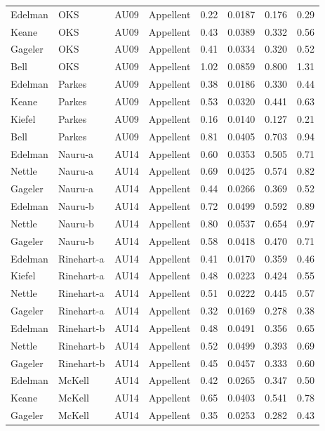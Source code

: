 \documentclass{monashthesis}
\begin{document}
\begin{center}
\begin{longtable}{llllllll}
Edelman & OKS & AU09 & Appellent & 0.22 & 0.0187 & 0.176 & 0.29 \\
Keane & OKS & AU09 & Appellent & 0.43 & 0.0389 & 0.332 & 0.56 \\
Gageler & OKS & AU09 & Appellent & 0.41 & 0.0334 & 0.320 & 0.52 \\
Bell & OKS & AU09 & Appellent & 1.02 & 0.0859 & 0.800 & 1.31 \\
Edelman & Parkes & AU09 & Appellent & 0.38 & 0.0186 & 0.330 & 0.44 \\
Keane & Parkes & AU09 & Appellent & 0.53 & 0.0320 & 0.441 & 0.63 \\
Kiefel & Parkes & AU09 & Appellent & 0.16 & 0.0140 & 0.127 & 0.21 \\
Bell & Parkes & AU09 & Appellent & 0.81 & 0.0405 & 0.703 & 0.94 \\
Edelman & Nauru-a & AU14 & Appellent & 0.60 & 0.0353 & 0.505 & 0.71 \\
Nettle & Nauru-a & AU14 & Appellent & 0.69 & 0.0425 & 0.574 & 0.82 \\
Gageler & Nauru-a & AU14 & Appellent & 0.44 & 0.0266 & 0.369 & 0.52 \\
Edelman & Nauru-b & AU14 & Appellent & 0.72 & 0.0499 & 0.592 & 0.89 \\
Nettle & Nauru-b & AU14 & Appellent & 0.80 & 0.0537 & 0.654 & 0.97 \\
Gageler & Nauru-b & AU14 & Appellent & 0.58 & 0.0418 & 0.470 & 0.71 \\
Edelman & Rinehart-a & AU14 & Appellent & 0.41 & 0.0170 & 0.359 & 0.46 \\
Kiefel & Rinehart-a & AU14 & Appellent & 0.48 & 0.0223 & 0.424 & 0.55 \\
Nettle & Rinehart-a & AU14 & Appellent & 0.51 & 0.0222 & 0.445 & 0.57 \\
Gageler & Rinehart-a & AU14 & Appellent & 0.32 & 0.0169 & 0.278 & 0.38 \\
Edelman & Rinehart-b & AU14 & Appellent & 0.48 & 0.0491 & 0.356 & 0.65 \\
Nettle & Rinehart-b & AU14 & Appellent & 0.52 & 0.0499 & 0.393 & 0.69 \\
Gageler & Rinehart-b & AU14 & Appellent & 0.45 & 0.0457 & 0.333 & 0.60 \\
Edelman & McKell & AU14 & Appellent & 0.42 & 0.0265 & 0.347 & 0.50 \\
Keane & McKell & AU14 & Appellent & 0.65 & 0.0403 & 0.541 & 0.78 \\
Gageler & McKell & AU14 & Appellent & 0.35 & 0.0253 & 0.282 & 0.43 \\

\end{longtable}
\end{center}
\end{document}
